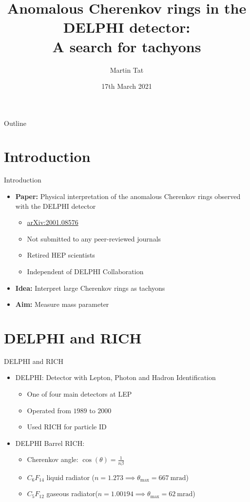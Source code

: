 \documentclass{beamer}
\title[Graduate Symposium]{Anomalous Cherenkov rings in the DELPHI detector:\\A search for tachyons}
\author{Martin Tat}
\institute{University of Oxford}
\date{17th March 2021}
\begin{document}
\begin{frame}
  \titlepage
\end{frame}

\begin{frame}{Outline}
  \tableofcontents
\end{frame}

\section{Introduction}
\begin{frame}{Introduction}
  \begin{itemize}
    \setlength\itemsep{1.4em}
    \item{\textbf{Paper:} Physical interpretation of the anomalous Cherenkov rings observed with the DELPHI detector}
    \begin{itemize}
      \item{\href{https://arxiv.org/abs/2001.08576v1}{arXiv:2001.08576}}
      \item{Not submitted to any peer-reviewed journals}
      \item{Retired HEP scientists}
      \item{Independent of DELPHI Collaboration}
    \end{itemize}
    \item{\textbf{Idea:} Interpret large Cherenkov rings as tachyons}
    \item{\textbf{Aim:} Measure mass parameter}
  \end{itemize}
\end{frame}

\section{DELPHI and RICH}
\begin{frame}{DELPHI and RICH}
  \begin{itemize}
    \setlength\itemsep{2.0em}
    \item{DELPHI: Detector with Lepton, Photon and Hadron Identification}
    \begin{itemize}
      \setlength\itemsep{0.7em}
      \item{One of four main detectors at LEP}
      \item{Operated from $1989$ to $2000$}
      \item{Used RICH for particle ID}
    \end{itemize}
    \item{DELPHI Barrel RICH:}
    \begin{itemize}
      \setlength\itemsep{0.7em}
      \item{Cherenkov angle: $\cos(\theta) = \frac{1}{n\beta}$}
      \item{$C_6F_{14}$ liquid radiator ($n = 1.273 \implies \theta_\text{max} = \SI{667}{\milli\radian}$)}
      \item{$C_5F_{12}$ gaseous radiator($n = 1.00194 \implies \theta_\text{max} = \SI{62}{\milli\radian}$)}
    \end{itemize}
  \end{itemize}
\end{frame}
\end{document}
